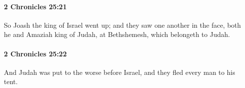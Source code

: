 		\paragraph{2 Chronicles 25:21} %
			\label{2CHRONICLES-25-21}

			So Joash the king of Israel went up; and they saw one another in the face, both he and Amaziah king of Judah, at Bethshemesh, which belongeth to Judah.


		\paragraph{2 Chronicles 25:22} %
			\label{2CHRONICLES-25-22}

			And Judah was put to the worse before Israel, and they fled every man to his tent.


